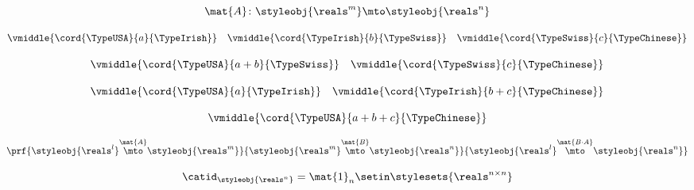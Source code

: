 \begin{forslides}
            
             \begin{equation}
                \label{eq:semicats-slides-126}
                \mat{A} \colon \styleobj{\reals^m} \mto \styleobj{\reals^n}
            \end{equation}
            
          
             \begin{equation}
                \label{eq:semicats-slides-127}
                \vmiddle{\cord{\TypeUSA}{a}{\TypeIrish}} \quad \vmiddle{\cord{\TypeIrish}{b}{\TypeSwiss}} \quad \vmiddle{\cord{\TypeSwiss}{c}{\TypeChinese}}
            \end{equation}
            
         
             \begin{equation}
                \label{eq:semicats-slides-128}
                \vmiddle{\cord{\TypeUSA}{a + b}{\TypeSwiss}} \quad \vmiddle{\cord{\TypeSwiss}{c}{\TypeChinese}}
            \end{equation}
            
                   \begin{equation}
                \label{eq:semicats-slides-129}
                \vmiddle{\cord{\TypeUSA}{a}{\TypeIrish}} \quad \vmiddle{\cord{\TypeIrish}{b + c}{\TypeChinese}}
            \end{equation}
            
            
             \begin{equation}
                \label{eq:semicats-slides-130}
                \vmiddle{\cord{\TypeUSA}{a + b + c}{\TypeChinese}}
            \end{equation}
            
           
             \begin{equation}
                \label{eq:semicats-slides-131}
                \prf{
            \styleobj{\reals^l} \overset{\mat{A}}{\mto} \styleobj{\reals^m}
        }{
            \styleobj{\reals^m} \overset{\mat{B}}{\mto} \styleobj{\reals^n}
        }{
            \styleobj{\reals^l} \overset{\mat{B \cdot A}}{\mto} \styleobj{\reals^n}
        }
            \end{equation}
            
        
             \begin{equation}
                \label{eq:semicats-slides-132}
                \catid_{\styleobj{\reals^n}} = \mat{1}_n \setin \stylesets{\reals^{n \times n}}
            \end{equation}
            

\end{forslides}
